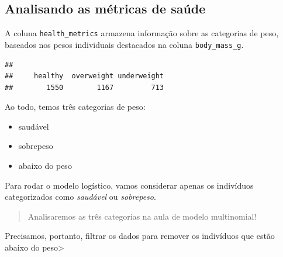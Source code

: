 \documentclass[
]{book}
\newenvironment{Shaded}{\begin{snugshade}}{\end{snugshade}}
\newcommand{\CommentTok}[1]{\textcolor[rgb]{0.56,0.35,0.01}{\textit{#1}}}
\newcommand{\FunctionTok}[1]{\textcolor[rgb]{0.13,0.29,0.53}{\textbf{#1}}}
\newcommand{\NormalTok}[1]{#1}
\newcommand{\SpecialCharTok}[1]{\textcolor[rgb]{0.81,0.36,0.00}{\textbf{#1}}}
\providecommand{\tightlist}{%
  \setlength{\itemsep}{0pt}\setlength{\parskip}{0pt}}
\begin{document}
\subsection{Analisando as métricas de saúde}\label{analisando-as-muxe9tricas-de-sauxfade}

A coluna \texttt{health\_metrics} armazena informação sobre as categorias de peso, baseados nos pesos individuais destacados na coluna \texttt{body\_mass\_g}.

\begin{Shaded}
\end{Shaded}

\begin{verbatim}
## 
##     healthy  overweight underweight 
##        1550        1167         713
\end{verbatim}

Ao todo, temos três categorias de peso:

\begin{itemize}
\tightlist
\item
  saudável
\item
  sobrepeso
\item
  abaixo do peso
\end{itemize}

Para rodar o modelo logístico, vamos considerar apenas os indivíduos categorizados como \emph{saudável} ou \emph{sobrepeso}.

\begin{quote}
Analisaremos as três categorias na aula de modelo multinomial!
\end{quote}

Precisamos, portanto, filtrar os dados para remover os indivíduos que estão abaixo do peso\textgreater{}
\end{document}
